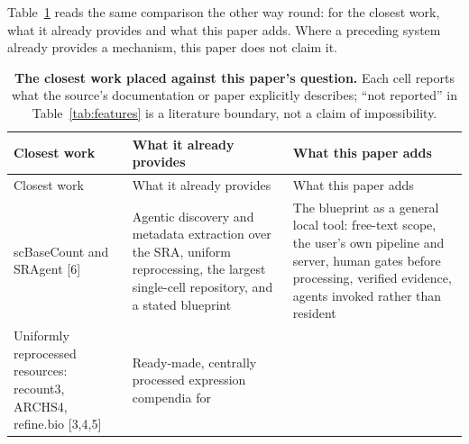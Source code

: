 \documentclass[11pt,a4paper]{article}
\begin{document}
\endlandscape

Table~\ref{tab:closest} reads the same comparison the other way round: for the closest
work, what it already provides and what this paper adds. Where a
preceding system already provides a mechanism, this paper does not claim
it.

\begin{longtable}[]{@{}
  >{\raggedright\arraybackslash}p{}
  >{\raggedright\arraybackslash}p{}
  >{\raggedright\arraybackslash}p{}@{}}
\caption{\label{tab:closest}\textbf{The closest work placed against this paper's question.}
Each cell reports what the source's documentation or paper explicitly
describes; ``not reported'' in Table~\ref{tab:features} is a literature boundary, not a
claim of impossibility.}\tabularnewline
\toprule\noalign{}
\begin{minipage}[b]{\linewidth}\raggedright
Closest work
\end{minipage} & \begin{minipage}[b]{\linewidth}\raggedright
What it already provides
\end{minipage} & \begin{minipage}[b]{\linewidth}\raggedright
What this paper adds
\end{minipage} \\
\midrule\noalign{}
\endfirsthead
\toprule\noalign{}
\begin{minipage}[b]{\linewidth}\raggedright
Closest work
\end{minipage} & \begin{minipage}[b]{\linewidth}\raggedright
What it already provides
\end{minipage} & \begin{minipage}[b]{\linewidth}\raggedright
What this paper adds
\end{minipage} \\
\midrule\noalign{}
\endhead
\bottomrule\noalign{}
\endlastfoot
scBaseCount and SRAgent {[}6{]} & Agentic discovery and metadata
extraction over the SRA, uniform reprocessing, the largest single-cell
repository, and a stated blueprint & The blueprint as a general local
tool: free-text scope, the user's own pipeline and server, human gates
before processing, verified evidence, agents invoked rather than
resident \\
Uniformly reprocessed resources: recount3, ARCHS4, refine.bio
{[}3,4,5{]} & Ready-made, centrally processed expression compendia for

\end{longtable}
\end{document}
